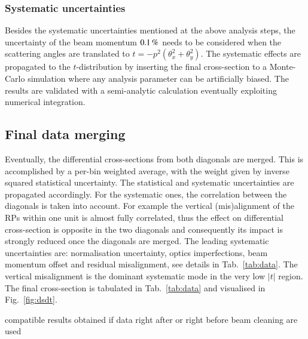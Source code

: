 \subsubsection{Systematic uncertainties}

Besides the systematic uncertainties mentioned at the above analysis steps, the uncertainty of the beam momentum $0.1\,{\rm \%}$ needs to be considered when the scattering angles are translated to $t = - p^2 (\theta_x^2 + \theta_y^2)$. The systematic effects are propagated to the $t$-distribution by inserting the final cross-section to a Monte-Carlo simulation where any analysis parameter can be artificially biased. The results are validated with a semi-analytic calculation eventually exploiting numerical integration.

\subsection{Final data merging}

Eventually, the differential cross-sections from both diagonals are merged. This is accomplished by a per-bin weighted average, with the weight given by inverse squared statistical uncertainty. The statistical and systematic uncertainties are propagated accordingly. For the systematic ones, the correlation between the diagonals is taken into account. For example the vertical (mis)alignment of the RPs within one unit is almost fully correlated, thus the effect on differential cross-section is opposite in the two diagonals and consequently its impact is strongly reduced once the diagonals are merged. The leading systematic uncertainties are: normalisation uncertainty, optics imperfections, beam momentum offset and residual misalignment, see details in Tab.~\ref{tab:data}. The vertical misalignment is the dominant systematic mode in the very low $|t|$ region. The final cross-section is tabulated in Tab.~\ref{tab:data} and visualised in Fig.~\ref{fig:dsdt}.


 compatible results obtained if data right after or right before beam cleaning are used





